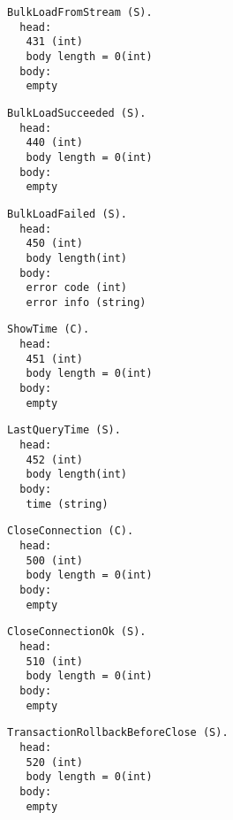 \documentclass[a4paper,12pt]{article}
\begin{document}
\begin{verbatim}
BulkLoadFromStream (S).
  head:
   431 (int)
   body length = 0(int)
  body:
   empty
\end{verbatim}

\begin{verbatim}
BulkLoadSucceeded (S).
  head:
   440 (int)
   body length = 0(int)
  body:
   empty
\end{verbatim}

\begin{verbatim}
BulkLoadFailed (S).
  head:
   450 (int)
   body length(int)
  body:
   error code (int)
   error info (string)
\end{verbatim}

\begin{verbatim}
ShowTime (C).
  head:
   451 (int)
   body length = 0(int)
  body:
   empty
\end{verbatim}

\begin{verbatim}
LastQueryTime (S).
  head:
   452 (int)
   body length(int)
  body:
   time (string)
\end{verbatim}

\begin{verbatim}
CloseConnection (C).
  head:
   500 (int)
   body length = 0(int)
  body:
   empty
\end{verbatim}

\begin{verbatim}
CloseConnectionOk (S).
  head:
   510 (int)
   body length = 0(int)
  body:
   empty
\end{verbatim}

\begin{verbatim}
TransactionRollbackBeforeClose (S).
  head:
   520 (int)
   body length = 0(int)
  body:
   empty
\end{verbatim}
\end{document}
